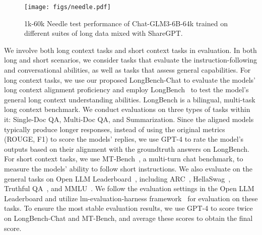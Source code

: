 \begin{figure}[t]
    \centering
    \texttt{[image: figs/needle.pdf]}
    \caption{1k-60k Needle test performance of Chat-GLM3-6B-64k trained on different suites of long data mixed with ShareGPT.}
    \label{fig:needle}
\end{figure}

We involve both long context tasks and short context tasks in evaluation.
In both long and short scenarios, we consider tasks that evaluate the instruction-following and conversational abilities, as well as tasks that assess general capabilities. 
For long context tasks, we use our proposed LongBench-Chat to evaluate the models' long context alignment proficiency and employ LongBench~\cite{bai2023longbench} to test the model's general long context understanding abilities. 
LongBench is a bilingual, multi-task long context benchmark. We conduct evaluations on three types of tasks within it: Single-Doc QA, Multi-Doc QA, and Summarization. 
Since the aligned models typically produce longer responses, instead of using the original metrics (ROUGE, F1) to score the models' replies, we use GPT-4 to rate the model's outputs based on their alignment with the groundtruth answers on LongBench.
For short context tasks, we use MT-Bench~\cite{zheng2023judging}, a multi-turn chat benchmark, to measure the models' ability to follow short instructions. We also evaluate on the general tasks on Open LLM Leaderboard~\cite{openllm}, including ARC~\cite{clark2018think}, HellaSwag~\cite{zellers2019hellaswag}, Truthful QA~\cite{lin2022truthfulqa}, and MMLU~\cite{hendrycks2021measuring}.
We follow the evaluation settings in the Open LLM Leaderboard and utilize lm-evaluation-harness framework~\cite{eval-harness} for evaluation on these tasks.
To ensure the most stable evaluation results, we use GPT-4 to score twice on LongBench-Chat and MT-Bench, and average these scores to obtain the final score.


